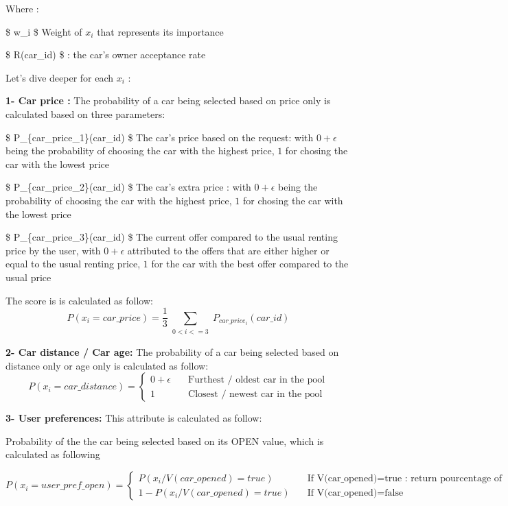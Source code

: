 \documentclass[11pt]{article}
\begin{document}
Where :

\$ w\_i \$ Weight of \(x_i\) that represents its importance

\$ R(car\_id) \$ : the car's owner acceptance rate

Let's dive deeper for each \(x_i\) :

\textbf{1- Car price :} The probability of a car being selected based on
price only is calculated based on three parameters:

\$ P\_\{car\_price\_1\}(car\_id) \$ The car's price based on the
request: with \(0+ \epsilon\) being the probability of choosing the car
with the highest price, \(1\) for chosing the car with the lowest price

\$ P\_\{car\_price\_2\}(car\_id) \$ The car's extra price : with
\(0+ \epsilon\) being the probability of choosing the car with the
highest price, \(1\) for chosing the car with the lowest price

\$ P\_\{car\_price\_3\}(car\_id) \$ The current offer compared to the
usual renting price by the user, with \(0+ \epsilon\) attributed to the
offers that are either higher or equal to the usual renting price, \(1\)
for the car with the best offer compared to the usual price

The score is is calculated as follow:
\[ P(x_i = car\_price) = \frac{1}{3} \sum_{\substack{   0<i<=3  }}  P_{car\_price_i}(car\_id)  \]

\textbf{2- Car distance / Car age:} The probability of a car being
selected based on distance only or age only is calculated as follow:
\[ P(x_i = car\_distance) = 
  \begin{cases}
    0+ \epsilon       & \quad \text{Furthest / oldest car in the pool}\\
    1       & \quad \text{Closest / newest car in the pool}
  \end{cases}
\]

\textbf{3- User preferences:} This attribute is calculated as follow:

Probability of the the car being selected based on its OPEN value, which
is calculated as following

\[ P(x_i = user\_pref\_open) = 
  \begin{cases}
    P(x_i / V(car\_opened)=true )       & \quad \text{If V(car_opened)=true : return pourcentage of opened car booked by the user}\\
    1-P(x_i / V(car\_opened)=true )        & \quad \text{If V(car_opened)=false}
  \end{cases}
\]
\end{document}
